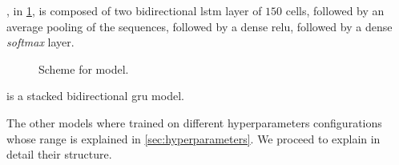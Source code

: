 \lstmb{}, in \cref{fig:schemeLstmb}, is composed of two bidirectional
\ac{lstm} layer of 
$150$ cells, followed by an average pooling of the sequences,
followed by a dense \ac{relu}, followed by a dense \emph{softmax}
layer. 
\begin{figure}
  \centering
  \caption{Scheme for \lstmb{} model.}
  \label{fig:schemeLstmb}
\end{figure}

\gru{} is a stacked bidirectional \ac{gru} model.

The other models where trained on different hyperparameters
configurations whose range is explained in
\cref{sec:hyperparameters}. We proceed to explain in detail their
structure.

